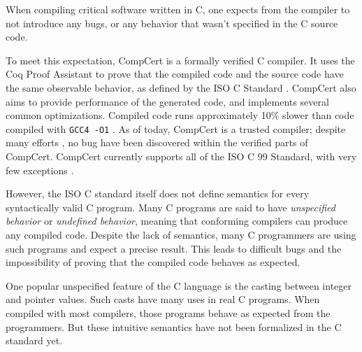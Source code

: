 When compiling critical software written in C, one expects from the compiler to not introduce any bugs, or any behavior that wasn't specified in the C source code.

To meet this expectation, CompCert \cite{DBLP:journals/cacm/Leroy09} is a formally verified C compiler.
It uses the Coq Proof Assistant \cite{coq} to prove that the compiled code and the source code have the same observable behavior, as defined by the ISO C Standard \cite{iso}. CompCert also aims to provide performance of the generated code, and implements several common optimizations. Compiled code runs approximately 10\% slower than code compiled with \texttt{GCC4 -O1} \cite{compcertwebsite}.
As of today, CompCert is a trusted compiler; despite many efforts \cite{DBLP:conf/pldi/YangCER11}, no bug have been discovered within the verified parts of CompCert.
CompCert currently supports all of the ISO C 99 Standard, with very few exceptions \cite{compcertwebsite}.

However, the ISO C standard itself does not define semantics for every syntactically valid C program.
Many C programs are said to have \textit{unspecified behavior} or \textit{undefined behavior}, meaning that conforming compilers can produce any compiled code.
Despite the lack of semantics, many C programmers are using such programs and expect a precise result. %
This leads to difficult bugs  and the impossibility of proving that the compiled code behaves as expected.

One popular unspecified feature of the C language is the casting between integer and pointer values.
Such casts have many uses in real C programs. 
When compiled with most compilers, those programs behave as expected from the programmers. But these intuitive semantics have not been formalized in the C standard yet.

